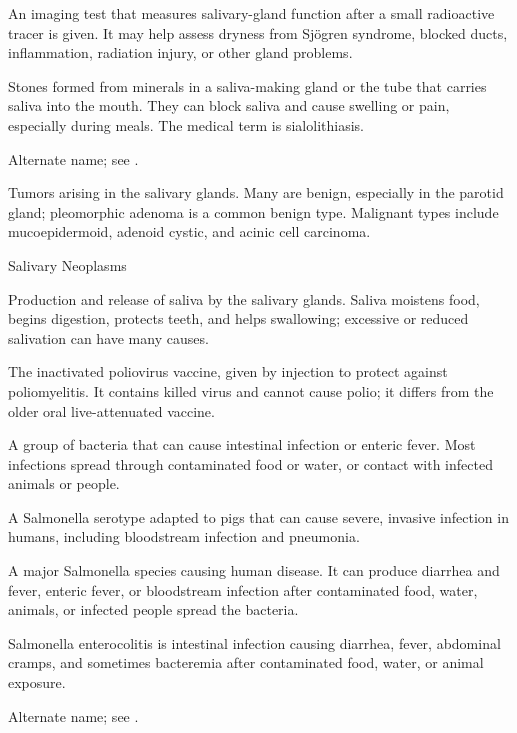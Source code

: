  An imaging test that measures salivary-gland function after a small radioactive tracer is given. It may help assess dryness from Sjögren syndrome, blocked ducts, inflammation, radiation injury, or other gland problems.

 Stones formed from minerals in a saliva-making gland or the tube that carries saliva into the mouth. They can block saliva and cause swelling or pain, especially during meals. The medical term is sialolithiasis.

 Alternate name; see .

 Tumors arising in the salivary glands. Many are benign, especially in the parotid gland;
pleomorphic adenoma is a common benign type. Malignant types include mucoepidermoid,
adenoid cystic, and acinic cell carcinoma.

\synonyms
Salivary Neoplasms

 Production and release of saliva by the salivary glands. Saliva moistens food, begins digestion, protects teeth, and helps swallowing; excessive or reduced salivation can have many causes.

 The inactivated poliovirus vaccine, given by injection to protect against poliomyelitis. It contains killed virus and cannot cause polio; it differs from the older oral live-attenuated vaccine.

 A group of bacteria that can cause intestinal infection or enteric fever. Most infections spread through contaminated food or water, or contact with infected animals or people.

 A Salmonella serotype adapted to pigs that can cause severe, invasive infection in humans, including bloodstream infection and pneumonia.

 A major Salmonella species causing human disease. It can produce diarrhea and fever, enteric fever, or bloodstream infection after contaminated food, water, animals, or infected people spread the bacteria.

 Salmonella enterocolitis is intestinal infection causing diarrhea, fever, abdominal cramps, and sometimes bacteremia after contaminated food, water, or animal exposure.

 Alternate name; see .

